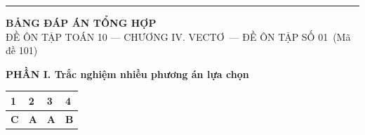 \documentclass[10pt,a4paper]{article}
\newcommand{\examKind}{ĐỀ ÔN TẬP SỐ 01}
\newcommand{\examTitle}{ĐỀ ÔN TẬP TOÁN 10 — CHƯƠNG IV. VECTƠ}
\newcommand{\examCode}{101}
\begin{document}
\newpage
\pagestyle{dapan}
\setcounter{page}{1}

{\color{navy}\hrule height 1.2pt}\vspace{6pt}
\begin{center}
  {\Large\sffamily\bfseries\color{ink} BẢNG ĐÁP ÁN TỔNG HỢP}\\[2pt]
  {\small\sffamily\color{muted} \examTitle\ — \examKind\ (Mã đề \examCode)}
\end{center}
\vspace{6pt}

\noindent\textsf{\small\textbf{\color{ink}PHẦN I. Trắc nghiệm nhiều phương án lựa chọn}}
\vspace{3pt}

\begin{center}
\renewcommand{\arraystretch}{1.28}
\begin{tabular}{|C{1.4cm}|C{1.4cm}|C{1.4cm}|C{1.4cm}|}
\hline
{}
\textsf{\textbf{\color{navy}1}} & \textsf{\textbf{\color{navy}2}} & \textsf{\textbf{\color{navy}3}} & \textsf{\textbf{\color{navy}4}} \\ \hline
\textbf{\color{ink}C} & \textbf{\color{ink}A} & \textbf{\color{ink}A} & \textbf{\color{ink}B} \\ \hline
\end{tabular}
\end{center}
\end{document}
